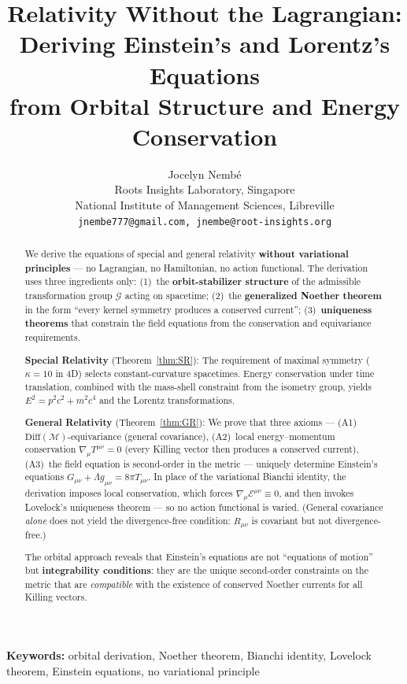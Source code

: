 \documentclass[11pt,twocolumn]{article}
\title{\textbf{Relativity Without the Lagrangian:\\Deriving Einstein's and Lorentz's Equations\\from Orbital Structure and Energy Conservation}}
\author{Jocelyn Nemb\'e\\
\small Roots Insights Laboratory, Singapore\\
\small National Institute of Management Sciences, Libreville\\
\small \texttt{jnembe777@gmail.com, jnembe@root-insights.org}}
\date{}
\theoremstyle{plain}\newtheorem{theorem}{Theorem}\newtheorem{proposition}[theorem]{Proposition}\newtheorem{corollary}[theorem]{Corollary}\newtheorem{lemma}[theorem]{Lemma}
\theoremstyle{definition}\newtheorem{definition}[theorem]{Definition}
\theoremstyle{remark}\newtheorem{remark}[theorem]{Remark}
\newcommand{\Diff}{\mathrm{Diff}}
\begin{document}
\maketitle

\begin{abstract}
We derive the equations of special and general relativity \textbf{without variational principles} --- no Lagrangian, no Hamiltonian, no action functional. The derivation uses three ingredients only: (1)~the \textbf{orbit-stabilizer structure} of the admissible transformation group $\mathcal{G}$ acting on spacetime; (2)~the \textbf{generalized Noether theorem} in the form ``every kernel symmetry produces a conserved current''; (3)~\textbf{uniqueness theorems} that constrain the field equations from the conservation and equivariance requirements.

\textbf{Special Relativity} (Theorem~\ref{thm:SR}): The requirement of maximal symmetry ($\kappa = 10$ in 4D) selects constant-curvature spacetimes. Energy conservation under time translation, combined with the mass-shell constraint from the isometry group, yields $E^2 = p^2c^2 + m^2c^4$ and the Lorentz transformations.

\textbf{General Relativity} (Theorem~\ref{thm:GR}): We prove that three axioms --- (A1)~$\Diff(\mathcal{M})$-equivariance (general covariance), (A2)~local energy--momentum conservation $\nabla_\mu T^{\mu\nu}=0$ (every Killing vector then produces a conserved current), (A3)~the field equation is second-order in the metric --- uniquely determine Einstein's equations $G_{\mu\nu} + \Lambda g_{\mu\nu} = 8\pi T_{\mu\nu}$. In place of the variational Bianchi identity, the derivation imposes local conservation, which forces $\nabla_\mu\mathcal{E}^{\mu\nu}\equiv0$, and then invokes Lovelock's uniqueness theorem --- so no action functional is varied. (General covariance \emph{alone} does not yield the divergence-free condition: $R_{\mu\nu}$ is covariant but not divergence-free.)

The orbital approach reveals that Einstein's equations are not ``equations of motion'' but \textbf{integrability conditions}: they are the unique second-order constraints on the metric that are \emph{compatible} with the existence of conserved Noether currents for all Killing vectors.
\end{abstract}

\noindent\textbf{Keywords:} orbital derivation, Noether theorem, Bianchi identity, Lovelock theorem, Einstein equations, no variational principle
\end{document}
